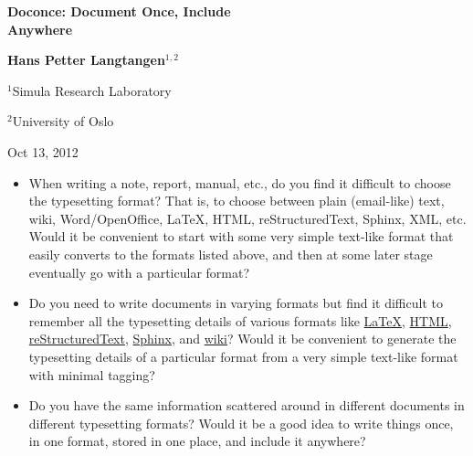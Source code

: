 \documentclass[twoside]{article}
\begin{document}





\begin{center}
{\LARGE\bf Doconce: Document Once, Include \\ [1.5mm] Anywhere}
\end{center}





\begin{center}
{\bf Hans Petter Langtangen${}^{1, 2}$} \\ [0mm]
\end{center}

\begin{center}
\centerline{{\small ${}^1$Simula Research Laboratory}}
\centerline{{\small ${}^2$University of Oslo}}
\end{center}





\begin{center}
Oct 13, 2012
\end{center}

\vspace{1cm}



\begin{itemize}
 \item When writing a note, report, manual, etc., do you find it difficult
   to choose the typesetting format? That is, to choose between plain
   (email-like) text, wiki, Word/OpenOffice, {\LaTeX}, HTML,
   reStructuredText, Sphinx, XML, etc.  Would it be convenient to
   start with some very simple text-like format that easily converts
   to the formats listed above, and then at some later stage
   eventually go with a particular format?

 \item Do you need to write documents in varying formats but find it
   difficult to remember all the typesetting details of various
   formats like \href{{http://refcards.com/docs/silvermanj/amslatex/LaTeXRefCard.v2.0.pdf}}{LaTeX}, \href{{http://www.htmlcodetutorial.com/}}{HTML}, \href{{http://docutils.sourceforge.net/docs/ref/rst/restructuredtext.html}}{reStructuredText}, \href{{http://sphinx.pocoo.org/contents.html}}{Sphinx}, and \href{{http://code.google.com/p/support/wiki/WikiSyntax}}{wiki}? Would it be convenient
   to generate the typesetting details of a particular format from a
   very simple text-like format with minimal tagging?

 \item Do you have the same information scattered around in different
   documents in different typesetting formats? Would it be a good idea
   to write things once, in one format, stored in one place, and
   include it anywhere?
\end{itemize}
\end{document}

